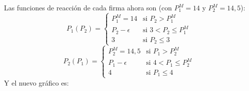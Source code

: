 \begin{parts}
\begin{solution}
Las funciones de reacción de cada firma ahora son (con $P_1^M = 14$ y $P_2^M = 14{,}5$):
\[
  P_1(P_2) =
  \begin{cases}
    P_1^M = 14 & \text{si } P_2 > P_1^M \\
    P_2 - \epsilon & \text{si } 3 < P_2 \leq P_1^M \\
    3 & \text{si } P_2 \leq 3
  \end{cases}
\]
\[
  P_2(P_1) =
  \begin{cases}
    P_2^M = 14{,}5 & \text{si } P_1 > P_2^M \\
    P_1 - \epsilon & \text{si } 4 < P_1 \leq P_2^M \\
    4 & \text{si } P_1 \leq 4
  \end{cases}
\]
Y el nuevo gráfico es:

\end{solution}
\end{parts}

